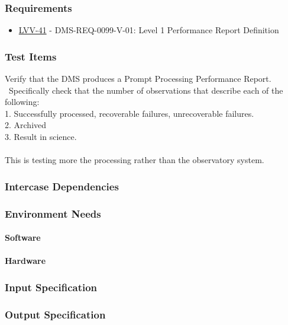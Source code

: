 \subsubsection{Requirements}
\begin{itemize}
\item \href{https://jira.lsstcorp.org/browse/LVV-41}{LVV-41} - DMS-REQ-0099-V-01: Level 1 Performance Report Definition
\end{itemize}

\subsubsection{Test Items}
Verify that the DMS produces a Prompt Processing Performance Report.
~Specifically check that the number of observations that describe each
of the following:\\
1. Successfully processed, recoverable failures, unrecoverable
failures.\\
2. Archived\\
3. Result in science.\\
~\\
This is testing more the processing rather than the observatory system.



\subsubsection{Intercase Dependencies}

\subsubsection{Environment Needs}

\paragraph{Software}

\paragraph{Hardware}

\subsubsection{Input Specification}

\subsubsection{Output Specification}

